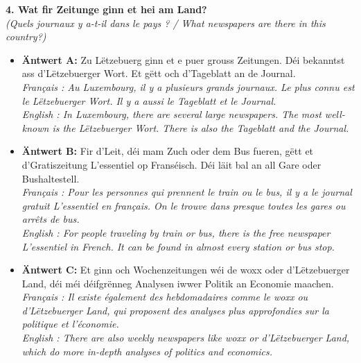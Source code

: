 \noindent\textbf{4. Wat fir Zeitunge ginn et hei am Land?}\\
\textit{(Quels journaux y a-t-il dans le pays ? / What newspapers are there in this country?)}
\begin{itemize}
    \item \textbf{Äntwert A:} Zu Lëtzebuerg ginn et e puer grouss Zeitungen. Déi bekanntst ass d'Lëtzebuerger Wort. Et gëtt och d'Tageblatt an de Journal.\\
    \textit{Français : Au Luxembourg, il y a plusieurs grands journaux. Le plus connu est le Lëtzebuerger Wort. Il y a aussi le Tageblatt et le Journal.}\\
    \textit{English : In Luxembourg, there are several large newspapers. The most well-known is the Lëtzebuerger Wort. There is also the Tageblatt and the Journal.}
    \item \textbf{Äntwert B:} Fir d'Leit, déi mam Zuch oder dem Bus fueren, gëtt et d'Gratiszeitung L'essentiel op Franséisch. Déi läit bal an all Gare oder Bushaltestell.\\
    \textit{Français : Pour les personnes qui prennent le train ou le bus, il y a le journal gratuit L'essentiel en français. On le trouve dans presque toutes les gares ou arrêts de bus.}\\
    \textit{English : For people traveling by train or bus, there is the free newspaper L'essentiel in French. It can be found in almost every station or bus stop.}
    \item \textbf{Äntwert C:} Et ginn och Wochenzeitungen wéi de woxx oder d'Lëtzebuerger Land, déi méi déifgrënneg Analysen iwwer Politik an Economie maachen.\\
    \textit{Français : Il existe également des hebdomadaires comme le woxx ou d'Lëtzebuerger Land, qui proposent des analyses plus approfondies sur la politique et l'économie.}\\
    \textit{English : There are also weekly newspapers like woxx or d'Lëtzebuerger Land, which do more in-depth analyses of politics and economics.}
\end{itemize}
\vspace{0.5em}

